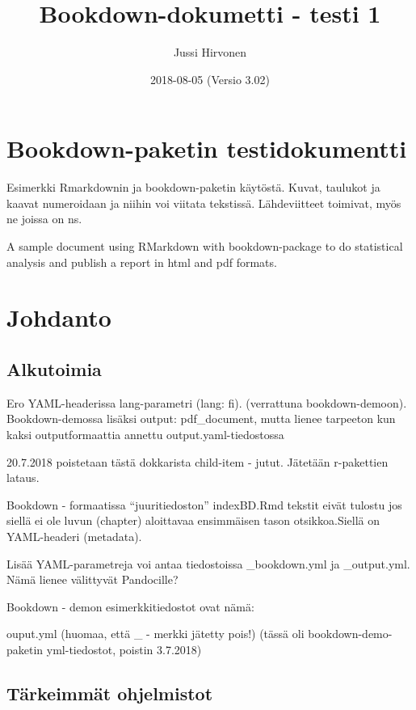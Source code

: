 \documentclass[finnish,]{book}
\title{Bookdown-dokumetti - testi 1}
\author{Jussi Hirvonen}
\date{2018-08-05 (Versio 3.02)}
\theoremstyle{definition}
\theoremstyle{definition}
\theoremstyle{definition}
\theoremstyle{remark}
\begin{document}
\maketitle

{
\setcounter{tocdepth}{1}
\tableofcontents
}
\hypertarget{bookdown-paketin-testidokumentti}{%
\chapter{Bookdown-paketin
testidokumentti}\label{bookdown-paketin-testidokumentti}}

Esimerkki Rmarkdownin ja bookdown-paketin käytöstä. Kuvat, taulukot ja
kaavat numeroidaan ja niihin voi viitata tekstissä. Lähdeviitteet
toimivat, myös ne joissa on ns.

A sample document using RMarkdown with bookdown-package to do
statistical analysis and publish a report in html and pdf formats.

\hypertarget{johdanto}{%
\chapter{Johdanto}\label{johdanto}}

\hypertarget{alkutoimia}{%
\section{Alkutoimia}\label{alkutoimia}}

Ero YAML-headerissa lang-parametri (lang: fi). (verrattuna
bookdown-demoon). Bookdown-demossa lisäksi output: pdf\_document, mutta
lienee tarpeeton kun kaksi outputformaattia annettu
output.yaml-tiedostossa

20.7.2018 poistetaan tästä dokkarista child-item - jutut. Jätetään
r-pakettien lataus.

Bookdown - formaatissa ``juuritiedoston'' indexBD.Rmd tekstit eivät
tulostu jos siellä ei ole luvun (chapter) aloittavaa ensimmäisen tason
otsikkoa.Siellä on YAML-headeri (metadata).

Lisää YAML-parametreja voi antaa tiedostoissa \_bookdown.yml ja
\_output.yml. Nämä lienee välittyvät Pandocille?

Bookdown - demon esimerkkitiedostot ovat nämä:

ouput.yml (huomaa, että \_ - merkki jätetty pois!) (tässä oli
bookdown-demo-paketin yml-tiedostot, poistin 3.7.2018)

\hypertarget{tarkeimmat-ohjelmistot}{%
\section{Tärkeimmät ohjelmistot}\label{tarkeimmat-ohjelmistot}}
\end{document}
